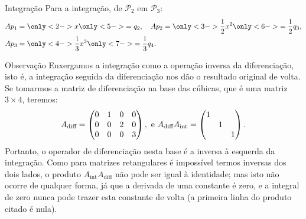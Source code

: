 \documentclass{beamer}
\newcommand{\zerodisplayskips}{%
  \setlength{\abovedisplayskip}{0pt}%
  \setlength{\belowdisplayskip}{0pt}%
  \setlength{\abovedisplayshortskip}{0pt}%
  \setlength{\belowdisplayshortskip}{0pt}}
\begin{document}
\begin{darkframes}
\begin{frame}{Integração}
  Para a integração, de ${\mathcal{P}}_2$ em ${\mathcal{P}}_3$:
  \begin{align*}
    Ap_1&=\only<2->{x}\only<5->{=q_2}, \quad Ap_2=\only<3->{\frac{1}{2}x^2}\only<6->{=\frac{1}{2}q_3}, \\
    Ap_3&=\only<4->{\frac{1}{3}x^3}\only<7->{=\frac{1}{3}q_4}.
  \end{align*}
\end{frame}

\begin{frame}{Observação}
  Enxergamos a integração como a operação inversa da diferenciação, isto é, a integração seguida da diferenciação nos dão o resultado original de volta. Se tomarmos a matriz de diferenciação na base das cúbicas, que é uma matriz $3\times 4$, teremos:
  \begin{equation*}
    \zerodisplayskips
  A_{\text{diff}}=
  \begin{pmatrix}
     0 & 1 & 0 & 0\\
     0 & 0 & 2 & 0\\
     0 & 0 & 0 & 3
  \end{pmatrix}
  , \text{ e } A_{\text{diff}} A_{\text{int}} =
  \begin{pmatrix}
     1& & \\
     &1& \\
     & &1
  \end{pmatrix}.
\end{equation*}
Portanto, o operador de diferenciação nesta base é a \alert{inversa à esquerda da integração}. Como para matrizes retangulares é impossível termos inversas dos dois lados, o produto $A_{\text{int}}A_{\text{diff}}$ não pode ser igual à identidade; mas isto não ocorre de qualquer forma, já que a derivada de uma constante é zero, e a integral de zero nunca pode trazer esta constante de volta (a primeira linha do produto citado é nula).
\end{frame}


\end{darkframes}
\end{document}
